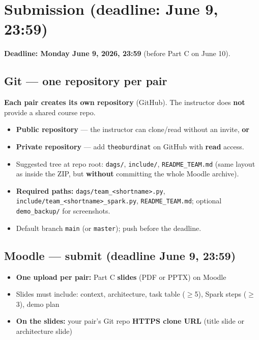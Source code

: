 \documentclass[11pt,a4paper]{article}
\begin{document}
\section*{Submission (deadline: June 9, 23:59)}
\label{sec:submission}

\textbf{Deadline: Monday June 9, 2026, 23:59} (before Part C on June 10).

\subsection*{Git --- one repository per pair}

\textbf{Each pair creates its own repository} (GitHub).
The instructor does \textbf{not} provide a shared course repo.

\begin{itemize}[nosep]
  \item \textbf{Public repository} --- the instructor can clone/read without an invite, \textbf{or}
  \item \textbf{Private repository} --- add \texttt{theoburdinat} on GitHub with \textbf{read} access.
  \item Suggested tree at repo root: \texttt{dags/}, \texttt{include/}, \texttt{README\_TEAM.md}
        (same layout as inside the ZIP, but \textbf{without} committing the whole Moodle archive).
  \item \textbf{Required paths:} \texttt{dags/team\_<shortname>.py},
        \texttt{include/team\_<shortname>\_spark.py}, \texttt{README\_TEAM.md};
        optional \texttt{demo\_backup/} for screenshots.
  \item Default branch \texttt{main} (or \texttt{master}); push before the deadline.
\end{itemize}

\subsection*{Moodle --- submit (deadline June 9, 23:59)}

\begin{itemize}[nosep]
  \item \textbf{One upload per pair:} Part C \textbf{slides} (PDF or PPTX) on Moodle
  \item Slides must include: context, architecture, task table ($\geq$5), Spark steps ($\geq$3), demo plan
  \item \textbf{On the slides:} your pair's Git repo \textbf{HTTPS clone URL} (title slide or architecture slide)
\end{itemize}
\end{document}
